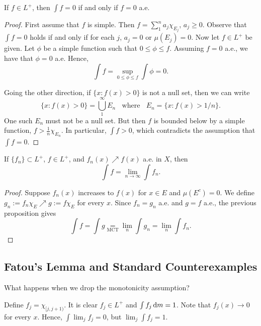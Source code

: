 \documentclass[12pt]{article} %
\begin{document}
\begin{proposition}\label{prop:L-plus-zero-ae}
    If $f \in L^+$, then $\int f = 0$ if and only if $f = 0$ a.e.
\end{proposition}

\begin{proof}
    First assume that $f$ is simple. Then $f = \sum_1^n a_j \chi_{E_j}$, $a_j \geq 0$. Observe that $\int f = 0$ holds if and only if for each $j$, $a_j = 0$ or $\mu(E_j) = 0$. Now let $f \in L^+$ be given. Let $\phi$ be a simple function such that $0 \leq \phi \leq f$. Assuming $f = 0$ a.e., we have that $\phi = 0$ a.e. Hence, \[\int f = \sup_{0 \leq \phi \leq f} \int \phi = 0.\]

    Going the other direction, if $\{x : f(x) > 0\}$ is not a null set, then we can write \[\{x : f(x) > 0\} = \bigcup_1^\infty E_n \ \ \ \ \text{where} \ \ \ \ E_n = \{x : f(x) > 1/n\}.\] One such $E_n$ must not be a null set. But then $f$ is bounded below by a simple function, $f > \frac{1}{n} \chi_{E_n}$. In particular, $\int f > 0$, which contradicts the assumption that $\int f = 0$.
\end{proof}

\begin{corollary}
    If $\{f_n\} \subset L^+$, $f \in L^+$, and $f_n(x) \nearrow f(x)$ a.e. in $X$, then \[\int f = \lim_{n \to \infty} \int f_n.\]
\end{corollary}

\begin{proof}
    Suppose $f_n(x)$ increases to $f(x)$ for $x \in E$ and $\mu(E^c) = 0$. We define $g_n := f_n \chi_E \nearrow g := f \chi_E$ for every $x$. Since $f_n = g_n$ a.e. and $g = f$ a.e., the previous proposition gives \[\int f = \int g \underset{\text{MCT}}{=} \lim_n \int g_n = \lim_n \int f_n.\]
\end{proof}

\subsection{Fatou's Lemma and Standard Counterexamples}

What happens when we drop the monotonicity assumption?

\begin{example}
    Define $f_j = \chi_{[j, j+1)}$. It is clear $f_j \in L^+$ and $\int f_j \, \mathrm{d} m = 1$. Note that $f_j(x) \to 0$ for every $x$. Hence, $\int \lim_j f_j = 0$, but $\lim_j \int f_j = 1$.
\end{example}
\end{document}
